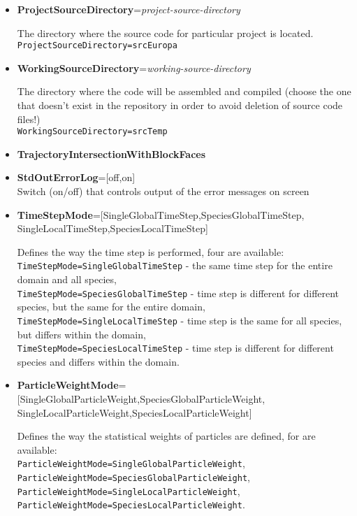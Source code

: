 \begin{itemize}
\item {\bf ProjectSourceDirectory}={\it project-source-directory}

The directory where the source code for particular project is located.\\
{\tt ProjectSourceDirectory=srcEuropa}

\item {\bf WorkingSourceDirectory}={\it working-source-directory}

The directory where the code will be assembled and compiled
(choose the one that doesn't exist in the repository in order
to avoid deletion of source code files!)\\
{\tt WorkingSourceDirectory=srcTemp}

\item {\bf TrajectoryIntersectionWithBlockFaces}

\item {\bf StdOutErrorLog}=[off,on] \\ Switch (on/off) that controls output of the error messages on screen

\item {\bf TimeStepMode}=[SingleGlobalTimeStep,SpeciesGlobalTimeStep, \\ SingleLocalTimeStep,SpeciesLocalTimeStep]

Defines the way the time step is performed, four are available:
\\{\tt TimeStepMode=SingleGlobalTimeStep} - the same time step
for the entire domain and all species,
\\{\tt TimeStepMode=SpeciesGlobalTimeStep} - time step is different for
different species, but the same for the entire domain,
\\{\tt TimeStepMode=SingleLocalTimeStep} - time step is the same for all species, 
but differs within the domain,
\\{\tt TimeStepMode=SpeciesLocalTimeStep} - time step is different for different
species and differs within the domain.

\item {\bf ParticleWeightMode}=[SingleGlobalParticleWeight,SpeciesGlobalParticleWeight, \\ SingleLocalParticleWeight,SpeciesLocalParticleWeight]

Defines the way the statistical weights of particles are defined, for are available:
\\{\tt  ParticleWeightMode=SingleGlobalParticleWeight},
\\{\tt  ParticleWeightMode=SpeciesGlobalParticleWeight},
\\{\tt  ParticleWeightMode=SingleLocalParticleWeight},
\\{\tt  ParticleWeightMode=SpeciesLocalParticleWeight}.


\end{itemize}
